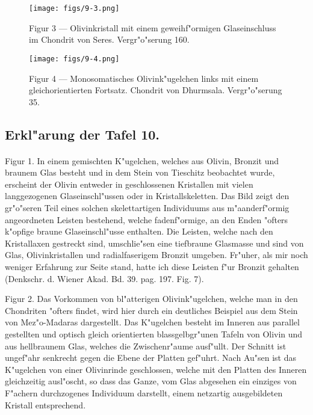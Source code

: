 \documentclass[a4paper, 11pt, oneside, polutonikogreek, german]{article}
\begin{document}
\vspace*{\fill}
\begin{figure}[H]
\centering
\texttt{[image: figs/9-3.png]}
\caption{\small Figur 3 --- Olivinkristall mit einem geweihf"ormigen Glaseinschluss im Chondrit von Seres. Vergr"o"serung 160.}
\end{figure}
\vspace*{\fill}
\clearpage

\vspace*{\fill}
\begin{figure}[H]
\centering
\texttt{[image: figs/9-4.png]}
\caption{\small Figur 4 --- Monosomatisches Olivink"ugelchen links mit einem gleichorientierten Fortsatz. Chondrit von Dhurmsala. Vergr"o"serung 35.}
\end{figure}
\vspace*{\fill}
\clearpage

\subsection{Erkl"arung der Tafel 10.}
\paragraph{}
Figur 1. In einem gemischten K"ugelchen, welches aus Olivin, Bronzit und braunem Glas besteht und in dem Stein von Tieschitz beobachtet wurde, erscheint der Olivin entweder in geschlossenen Kristallen mit vielen langgezogenen Glaseinschl"ussen oder in Kristallskeletten. Das Bild zeigt den gr"o"seren Teil eines solchen skelettartigen Individuums aus m"aanderf"ormig angeordneten Leisten bestehend, welche fadenf"ormige, an den Enden "ofters k"opfige braune Glaseinschl"usse enthalten. Die Leisten, welche nach den Kristallaxen gestreckt sind, umschlie"sen eine tiefbraune Glasmasse und sind von Glas, Olivinkristallen und radialfaserigem Bronzit umgeben. Fr"uher, als mir noch weniger Erfahrung zur Seite stand, hatte ich diese Leisten f"ur Bronzit gehalten (Denkschr. d. Wiener Akad. Bd. 39. pag. 197. Fig. 7).

Figur 2. Das Vorkommen von bl"atterigen Olivink"ugelchen, welche man in den Chondriten "ofters findet, wird hier durch ein deutliches Beispiel aus dem Stein von Mez"o-Madaras dargestellt. Das K"ugelchen besteht im Inneren aus parallel gestellten und optisch gleich orientierten blassgelbgr"unen Tafeln von Olivin und aus hellbraunem Glas, welches die Zwischenr"aume ausf"ullt. Der Schnitt ist ungef"ahr senkrecht gegen die Ebene der Platten gef"uhrt. Nach Au"sen ist das K"ugelchen von einer Olivinrinde geschlossen, welche mit den Platten des Inneren gleichzeitig ausl"oscht, so dass das Ganze, vom Glas abgesehen ein einziges von F"achern durchzogenes Individuum darstellt, einem netzartig ausgebildeten Kristall entsprechend.
\end{document}

